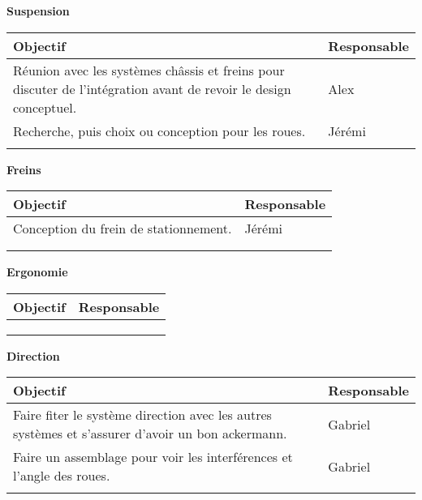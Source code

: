 \hfill \break
\textbf{\large Suspension}\\
\begin{tabularx}{\linewidth}{
    |>{\hsize=1.75\hsize}X|%
    >{\hsize=0.25\hsize}X|%
  }
    \hline
    \textbf{Objectif} & \textbf{Responsable} \\\hline
       Réunion avec les systèmes châssis et freins pour discuter de l'intégration avant de revoir le design conceptuel.&Alex \\\hline 
       Recherche, puis choix ou conception pour les roues. & Jérémi\\\hline
       & \\\hline 
\end{tabularx}



\hfill \break
\textbf{\large Freins}\\
\begin{tabularx}{\linewidth}{
    |>{\hsize=1.75\hsize}X|%
    >{\hsize=0.25\hsize}X|%
  }
    \hline
    \textbf{Objectif} & \textbf{Responsable} \\\hline
     Conception du frein de stationnement. & Jérémi\\\hline 
       & \\\hline
       & \\\hline 
\end{tabularx}


\hfill \break
\textbf{\large Ergonomie}\\
\begin{tabularx}{\linewidth}{
    |>{\hsize=1.75\hsize}X|%
    >{\hsize=0.25\hsize}X|%
  }
    \hline
    \textbf{Objectif} & \textbf{Responsable} \\\hline
       & \\\hline 
       & \\\hline
       & \\\hline 
\end{tabularx}

\hfill \break
\textbf{\large Direction}\\
\begin{tabularx}{\linewidth}{
    |>{\hsize=1.75\hsize}X|%
    >{\hsize=0.25\hsize}X|%
  }
    \hline
    \textbf{Objectif} & \textbf{Responsable} \\\hline
        Faire fiter le système direction avec les autres systèmes et s'assurer d'avoir un bon ackermann.&Gabriel
        \\\hline 
        Faire un assemblage pour voir les interférences et l'angle des roues.&Gabriel
        \\\hline
       & \\\hline 
\end{tabularx}


